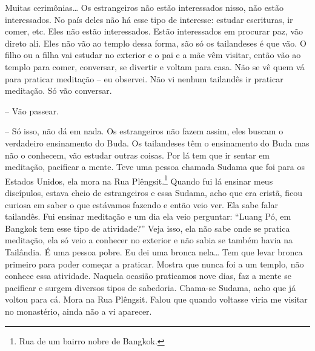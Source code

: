 Muitas cerimônias… Os estrangeiros não estão interessados nisso, não
estão interessados. No país deles não há esse tipo de interesse:
estudar escrituras, ir comer, etc. Eles não estão interessados. Estão
interessados em procurar paz, vão direto ali. Eles não vão ao templo
dessa forma, são só os tailandeses é que vão. O filho ou a filha vai
estudar no exterior e o pai e a mãe vêm visitar, então vão ao templo
para comer, conversar, se divertir e voltam para casa. Não se vê quem
vá para praticar meditação – eu observei. Não vi nenhum tailandês ir
praticar meditação. Só vão conversar.

-- Vão passear.

-- Só isso, não dá em nada. Os estrangeiros não fazem assim, eles
buscam o verdadeiro ensinamento do Buda. Os tailandeses têm o
ensinamento do Buda mas não o conhecem, vão estudar outras coisas. Por
lá tem que ir sentar em meditação, pacificar a mente. Teve uma pessoa
chamada Sudama que foi para os Estados Unidos, ela mora na Rua
Plêngsit.\footnote{Rua de um bairro nobre de Bangkok.} Quando fui lá
ensinar meus discípulos, estava cheio de estrangeiros e essa Sudama,
acho que era cristã, ficou curiosa em saber o que estávamos fazendo e
então veio ver. Ela sabe falar tailandês. Fui ensinar meditação e um
dia ela veio perguntar: “Luang Pó, em Bangkok tem esse tipo de
atividade?” Veja isso, ela não sabe onde se pratica meditação, ela só
veio a conhecer no exterior e não sabia se também havia na Tailândia. É
uma pessoa pobre. Eu dei uma bronca nela… Tem que levar bronca primeiro
para poder começar a praticar. Mostra que nunca foi a um templo, não
conhece essa atividade. Naquela ocasião praticamos nove dias, faz a
mente se pacificar e surgem diversos tipos de sabedoria. Chama-se
Sudama, acho que já voltou para cá. Mora na Rua Plêngsit. Falou que
quando voltasse viria me visitar no monastério, ainda não a vi
aparecer.

